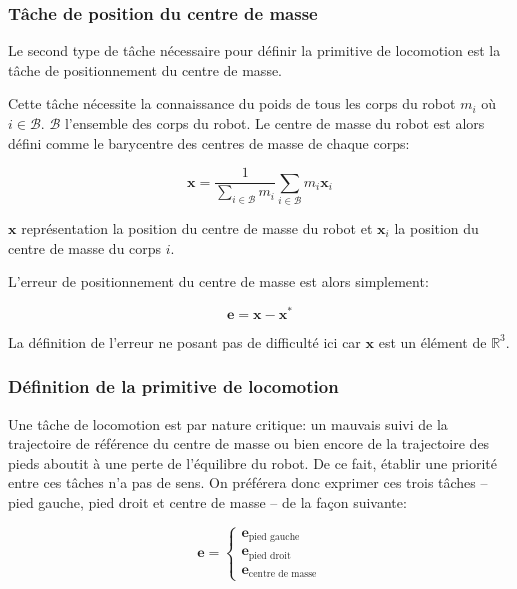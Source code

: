 \subsubsection{Tâche de position du centre de masse}


Le second type de tâche nécessaire pour définir la primitive de
locomotion est la tâche de positionnement du centre de masse.

Cette tâche nécessite la connaissance du poids de tous les corps du
robot $m_i$ où $i \in \mathcal{B}$. $\mathcal{B}$ l'ensemble des corps
du robot. Le centre de masse du robot est alors
défini comme le barycentre des centres de masse de chaque corps:

\begin{equation}
  \mathbf{x} = \frac{1}{\sum_{i \in \mathcal{B}} m_i} \sum_{i \in \mathcal{B}} m_i \mathbf{x}_i
\end{equation}

$\mathbf{x}$ représentation la position du centre de masse du robot et
$\mathbf{x}_i$ la position du centre de masse du corps $i$.

L'erreur de positionnement du centre de masse est alors simplement:

\begin{equation}
  \mathbf{e} = \mathbf{x} - \mathbf{x}^{*}
\end{equation}

La définition de l'erreur ne posant pas de difficulté ici car
$\mathbf{x}$ est un élément de $\mathbb{R}^3$.


\subsubsection{Définition de la primitive de locomotion}

Une tâche de locomotion est par nature critique: un mauvais suivi de
la trajectoire de référence du centre de masse ou bien encore de la
trajectoire des pieds aboutit à une perte de l'équilibre du robot. De
ce fait, établir une priorité entre ces tâches n'a pas de sens. On
préférera donc exprimer ces trois tâches -- pied gauche, pied droit et
centre de masse -- de la façon suivante:

\begin{equation}
  \mathbf{e} = \left\{
  \begin{array}{c}
    \mathbf{e}_{\text{pied gauche}}\\
    \mathbf{e}_{\text{pied droit}}\\
    \mathbf{e}_{\text{centre de masse}}
  \end{array}\right.
\end{equation}


